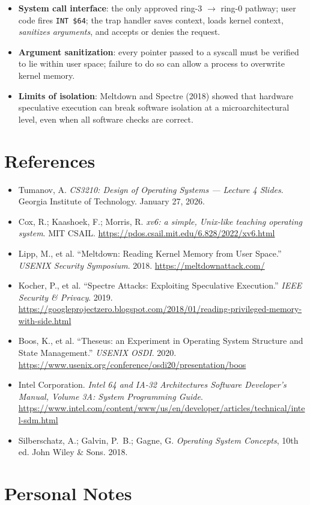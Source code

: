 \documentclass[11pt]{article}
\begin{document}
\begin{itemize}
    \item \textbf{System call interface}: the only approved ring-3 $\to$ ring-0 pathway;
          user code fires \texttt{INT \$64}; the trap handler saves context, loads kernel
          context, \emph{sanitizes arguments}, and accepts or denies the request.
    \item \textbf{Argument sanitization}: every pointer passed to a syscall must be
          verified to lie within user space; failure to do so can allow a process to overwrite
          kernel memory.
    \item \textbf{Limits of isolation}: Meltdown and Spectre (2018) showed that hardware
          speculative execution can break software isolation at a microarchitectural level,
          even when all software checks are correct.
\end{itemize}

\section{References}

\begin{itemize}
    \item Tumanov, A. \textit{CS3210: Design of Operating Systems --- Lecture 4 Slides}.
          Georgia Institute of Technology. January 27, 2026.
    \item Cox, R.; Kaashoek, F.; Morris, R. \textit{xv6: a simple, Unix-like teaching
          operating system}. MIT CSAIL. \url{https://pdos.csail.mit.edu/6.828/2022/xv6.html}
    \item Lipp, M., et al. ``Meltdown: Reading Kernel Memory from User Space.''
          \textit{USENIX Security Symposium}. 2018. \url{https://meltdownattack.com/}
    \item Kocher, P., et al. ``Spectre Attacks: Exploiting Speculative Execution.''
          \textit{IEEE Security \& Privacy}. 2019.
          \url{https://googleprojectzero.blogspot.com/2018/01/reading-privileged-memory-with-side.html}
    \item Boos, K., et al. ``Theseus: an Experiment in Operating System Structure and State
          Management.'' \textit{USENIX OSDI}. 2020.
          \url{https://www.usenix.org/conference/osdi20/presentation/boos}
    \item Intel Corporation. \textit{Intel 64 and IA-32 Architectures Software Developer's
          Manual, Volume 3A: System Programming Guide}.
          \url{https://www.intel.com/content/www/us/en/developer/articles/technical/intel-sdm.html}
    \item Silberschatz, A.; Galvin, P.~B.; Gagne, G. \textit{Operating System Concepts},
          10th ed. John Wiley \& Sons. 2018.
\end{itemize}

\section*{Personal Notes}
\end{document}
